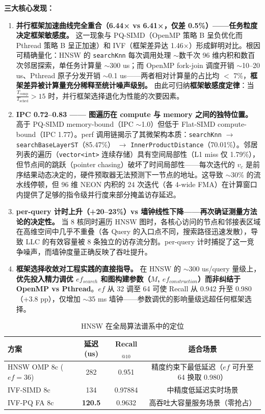\documentclass[UTF8,a4paper,10pt]{ctexart}
\begin{document}
\textbf{三大核心发现：}

\begin{enumerate}
\item \textbf{并行框架加速曲线完全重合（6.44× vs 6.41×，仅差 0.5\%）——任务粒度决定框架敏感度。} 这一现象与 PQ-SIMD（OpenMP 策略 B 呈负优化而 Pthread 策略 B 呈正加速）和 IVF（框架差异达 1.46×）形成鲜明对比。根因可精确量化：HNSW 的 \texttt{searchKnn} 每次调用处理 $\sim$数千次 96 维内积和数百次邻居探索，单任务计算量 $\sim$300 us；而 OpenMP fork-join 调度开销 $\sim$10--20 us、Pthread 原子分发开销 $\sim$0.1 us——两者相对计算量的占比均 $<$ 7\%，\textbf{框架差异被计算量充分稀释至统计噪声级别。} 由此可归纳\textbf{框架敏感度定律}：当 $\frac{T_{\text{comp}}}{T_{\text{sched}}} > 15$ 时，并行框架选择退化为性能的次要因素。

\item \textbf{IPC 0.72--0.83 —— 图遍历在 compute 与 memory 之间的独特位置。} 高于 PQ-SIMD memory-bound（IPC $\sim$1.0）但低于 Flat-SIMD compute-bound（IPC 1.77）。perf 调用链揭示了其微架构本质：\texttt{searchKnn} $\to$ \texttt{searchBaseLayerST}（85.47\%） $\to$ \texttt{InnerProductDistance}（70.01\%）。邻居列表的遍历（\texttt{vector<int>} 连续存储）具有空间局部性（L1 miss 仅 1.79\%），但节点间的跳跃（pointer chasing）破坏了时间局部性——每次迭代的 $v_c$ 是前序结果动态决定的，硬件预取器无法预测下一节点的地址。这导致 $\sim$30\% 的流水线停顿，但 96 维 NEON 内积的 24 次迭代（各 4-wide FMA）在计算窗口内提供了足够的指令级并行度来部分掩盖访存延迟。

\item \textbf{per-query 计时上升（+20--23\%）vs 墙钟线性下降——再次确证测量方法论的决定性。} 当 8 核同时遍历 HNSW 图时，各核心访问的节点和邻接表区域在高维空间中几乎不重叠（各 Query 的入口点不同，搜索路径迅速发散），导致 LLC 的有效容量被 8 条独立的访存流分割。per-query 计时捕捉了这一竞争噪声，而墙钟度量正确反映了吞吐提升。

\item \textbf{框架选择收敛对工程实践的直接指导。} 在 HNSW 的 $\sim$300 us/query 量级上，\textbf{优先投入精力调优 $ef_{search}$ 和图构建参数（$M$, $ef_{construction}$）而非纠结于 OpenMP vs Pthread}。$ef$ 从 32 调至 64 可使 Recall 从 0.942 升至 0.980（+3.8 pp），仅增加 $\sim$35 ms 墙钟——参数调优的影响量级远超任何框架选择。
\end{enumerate}

\begin{table}[H]
\centering
\caption{HNSW 在全局算法谱系中的定位}
\begin{tabular}{lccc}
\hline
方案 & 延迟 (us) & Recall$_{@10}$ & 适合场景 \\
\hline
HNSW OMP 8c ($ef=36$) & 282 & 0.951 & 精度约束下最低延迟（$ef$ 可升至 64 换取 0.980） \\
IVF-SIMD 8c & 134 & 0.97884 & 中精度低延迟实时场景 \\
IVF-PQ FA 8c & \textbf{120.5} & 0.9632 & 高吞吐大容量服务场景（零抢占） \\
\hline
\end{tabular}
\end{table}
\end{document}
